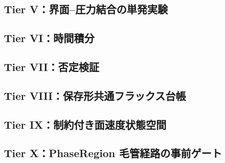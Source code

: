 \subsection{Tier V：界面--圧力結合の単発実験}

\subsection{Tier VI：時間積分}

\subsection{Tier VII：否定検証}

\subsection{Tier VIII：保存形共通フラックス台帳}

\subsection{Tier IX：制約付き面速度状態空間}

\subsection{Tier X：PhaseRegion 毛管経路の事前ゲート}


